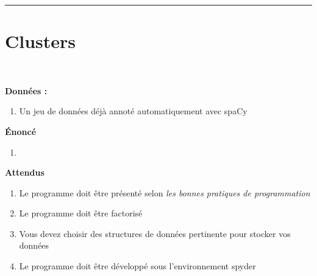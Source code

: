 \newcommand{\numTD}{TD3}
\newcommand{\themeTD}{Clustering avec un algorithm d'affinité de propagation}
\newcommand{\file}{toto.tex}



\hrule

\noindent{}
\newline
\section{Clusters}
~\\
\vspace{-1cm}


\textbf{Données :}
\begin{enumerate}
  \item Un jeu de données déjà annoté automatiquement avec spaCy
\end{enumerate}


\textbf{Énoncé}

\begin{enumerate}
  \item 
\end{enumerate}

\textbf{Attendus}
\begin{enumerate}
  \item Le programme doit être présenté selon \textit{les bonnes pratiques de programmation}
  \item Le programme doit être factorisé
  \item Vous devez choisir des structures de données pertinente pour stocker vos données
  \item Le programme doit être développé sous l'environnement spyder 
\end{enumerate}

